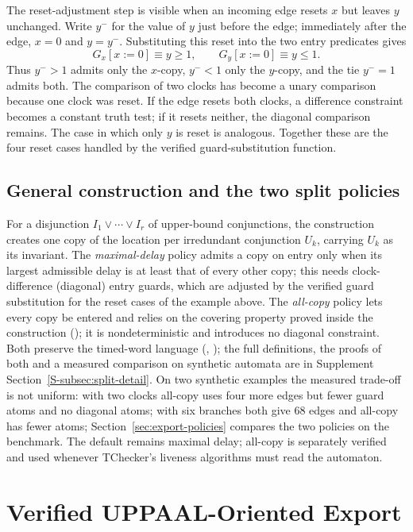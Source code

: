 \documentclass[preprint,12pt]{elsarticle}
\let\pathfragile\path
\DeclareRobustCommand\path{\pathfragile}
\begin{document}
The reset-adjustment step is visible when an incoming edge resets $x$ but
leaves $y$ unchanged. Write $y^{-}$ for the value of $y$ just before the
edge; immediately after the edge, $x=0$ and $y=y^{-}$. Substituting this
reset into the two entry predicates gives
\[
 G_x[x:=0]\equiv y\ge1,
 \qquad
 G_y[x:=0]\equiv y\le1.
\]
Thus $y^{-}>1$ admits only the $x$-copy, $y^{-}<1$ only the $y$-copy, and the
tie $y^{-}=1$ admits both. The comparison of two clocks has become a unary comparison
because one clock was reset. If the edge resets both clocks, a difference
constraint becomes a constant truth test; if it resets neither, the diagonal
comparison remains. The case in which only $y$ is reset is analogous. Together these are the four reset cases handled by the
verified guard-substitution function.

\subsection{General construction and the two split policies}
\label{subsec:split-construction}
For a disjunction $I_1\lor\cdots\lor I_r$ of upper-bound conjunctions, the construction creates one copy of the location per irredundant conjunction $U_k$, carrying $U_k$ as its invariant. The \emph{maximal-delay} policy admits a copy on entry only when its largest admissible delay is at least that of every other copy; this needs clock-difference (diagonal) entry guards, which are adjusted by the verified guard substitution for the reset cases of the example above. The \emph{all-copy} policy lets every copy be entered and relies on the covering property proved inside the construction (); it is nondeterministic and introduces no diagonal constraint. Both preserve the timed-word language (, ); the full definitions, the proofs of both and a measured comparison on synthetic automata are in Supplement Section~\ref{S-subsec:split-detail}. On two synthetic examples the measured trade-off is not uniform: with two clocks all-copy uses four more edges but fewer guard atoms and no diagonal atoms; with six branches both give 68 edges and all-copy has fewer atoms; Section~\ref{sec:export-policies} compares the two policies on the benchmark. The default remains maximal delay; all-copy is separately verified and used whenever TChecker's liveness algorithms must read the automaton.


\section{Verified UPPAAL-Oriented Export}
\label{sec:export}
\end{document}
